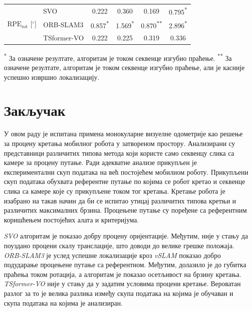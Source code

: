 \documentclass[12pt]{article}
\begin{document}
\begin{table}[H]
\begin{tabular*}{\textwidth}{@{\extracolsep{\fill}}llcccc@{}}
		\hline

		\multirow{3}{*}{$\mathrm{RPE}_{\mathrm{rot}}$ [$^\circ$]}
		& SVO & 0.222 & 0.360 & 0.169 & 0.795\textsuperscript{*} \\
		& ORB-SLAM3 & 0.857\textsuperscript{*} & 1.569\textsuperscript{*} & 0.870\textsuperscript{**} & 2.896\textsuperscript{*} \\
		& TSformer-VO & 0.222 & 0.225 & 0.319 & 0.336 \\

		\hline
	\end{tabular*}

	\vspace{0.5em}
	\begin{minipage}{\textwidth}
		\textsuperscript{*} За означене резултате, алгоритам је током секвенце изгубио праћење.\newline
		\textsuperscript{**} За означене резултате, алгоритам је током секвенце изгубио праћење, али је касније успешно извршио локализацију.
	\end{minipage}

\end{table}

\newpage

\section{Закључак}
У овом раду је испитана примена монокуларне визуелне одометрије као решење за
процену кретања мобилног робота у затвореном простору. Анализирани су
представници различитих типова метода који користе само секвенцу слика са
камере за процену путање. Ради адекватне анализе прикупљен је експериментални
скуп података на већ постојећем мобилном роботу. Прикупљени скуп података
обухвата референтне путање по којима се робот кретао и секвенце слика са камере
које су прикупљене током тог кретања. Кретање робота је изабрано на такав начин
да би се испитао утицај различитих типова кретњи и различитих максималних
брзина. Процењене путање су поређене са референтним коришћењем постојећих алата
и критеријума.

\textit{SVO} алгоритам је показао добру процену оријентације. Међутим, није у
стању да поуздано процени скалу транслације, што доводи до велике грешке
положаја. \textit{ORB-SLAM3} је услед успешне локализације кроз \textit{vSLAM}
показао добро подударање процењене путање са референтном. Међутим, долазило је
до губитка праћења током ротација, а алгоритам је показао осетљивост на брзину
кретања. \textit{TSformer-VO} није у стању да у задатим условима процени
кретање. Вероватан разлог за то је велика разлика између скупа података на
којима је обучаван и скупа података на којима је анализиран.
\end{document}
